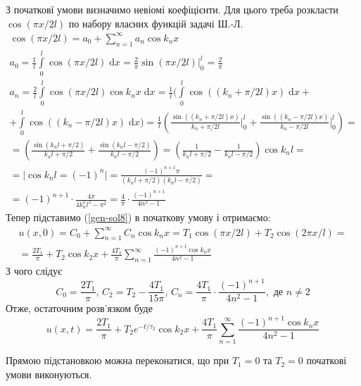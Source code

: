 З початковї умови визначимо невіомі коефіцієнти. Для цього треба розкласти $\cos(\pi x/2l)$ по набору власних функцій задачі Ш.-Л. 
\begin{equation*}
    \begin{gathered}
        \cos(\pi x/2l) = a_0 + \sum_{n=1}^{\infty} a_n \cos k_nx \\
        a_0 = \frac{1}{l}\int\limits_0^l \cos(\pi x/2l) \;\mathrm{d}x = \frac{2}{\pi} \sin(\pi x/2l) \bigg|_0^l = \frac{2}{\pi}\\
        a_n = \frac{2}{l}\int\limits_0^l \cos(\pi x/2l)\cos k_nx \;\mathrm{d}x = \frac{1}{l}\bigg(\int\limits_0^l \cos((k_n + \pi/2l)x) \;\mathrm{d}x +\\
        + \int\limits_0^l \cos((k_n - \pi/2l)x) \;\mathrm{d}x\bigg) = \frac{1}{l}\left(\frac{\sin((k_n + \pi/2l)x)}{k_n + \pi/2l}\bigg|_0^l + \frac{\sin((k_n - \pi/2l)x)}{k_n - \pi/2l}\bigg|_0^l\right) =\\
        = \left(\frac{\sin(k_nl + \pi/2)}{k_nl + \pi/2} + \frac{\sin(k_nl - \pi/2)}{k_nl - \pi/2}\right) = \left(\frac{1}{k_nl + \pi/2} - \frac{1}{k_nl - \pi/2}\right)\cos k_nl =\\
        = \big|\cos k_nl = (-1)^n\big| = \frac{(-1)^{n+1} \pi}{(k_nl + \pi/2)(k_nl - \pi/2)} =\\
        = (-1)^{n+1} \cdot \frac{4\pi}{4k_n^2l^2 - \pi^2} = \frac{4}{\pi} \cdot \frac{(-1)^{n+1}}{4n^2 - 1}
    \end{gathered}
\end{equation*}
Тепер підставимо (\ref{gen-sol8}) в початкову умову і отримаємо:
\begin{equation}
    \begin{gathered}
        u(x,0) = C_0 + \sum_{n=1}^{\infty}C_n \cos k_n x = T_1 \cos(\pi x/2l) + T_2 \cos(2\pi x/l) =\\
        = \frac{2T_1}{\pi} + T_2 \cos k_2x + \frac{4T_1}{\pi} \sum_{n=1}^{\infty} \frac{(-1)^{n+1} \cos k_nx}{4n^2 - 1}
    \end{gathered}
\end{equation} 
З чого слідує 
\begin{equation*}
    C_0 = \frac{2T_1}{\pi},\, C_2 = T_2 - \frac{4T_1}{15\pi},\, C_n = \frac{4T_1}{\pi} \cdot \frac{(-1)^{n+1}}{4n^2 - 1}, \text{ де } n \neq 2
\end{equation*}
Отже, остаточним розв'язком буде 
\begin{equation}
    u(x,t) = \frac{2T_1}{\pi} + T_2 e^{-t/\tau_2}\cos k_2x + \frac{4T_1}{\pi} \sum_{n=1}^{\infty} \frac{(-1)^{n+1} \cos k_nx}{4n^2 - 1}
\end{equation}

Прямою підстановкою можна переконатися, що при $T_1 = 0$ та $T_2 = 0$ початкові умови виконуються.


%